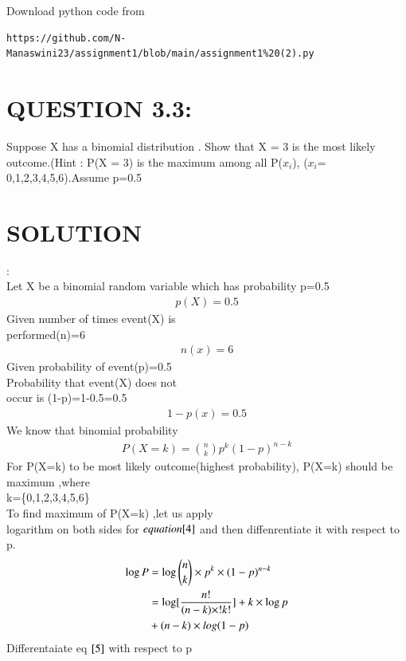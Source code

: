 \documentclass[journal,12pt,twocolumn]{IEEEtran}
\begin{document}
\renewcommand{\thefigure}{\theenumi}
\renewcommand{\thetable}{\theenumi}
Download python code from 
\begin{lstlisting}
https://github.com/N-Manaswini23/assignment1/blob/main/assignment1%20(2).py
\end{lstlisting}
%



\section*{ QUESTION 3.3:}
Suppose X has a binomial
 distribution . Show that X = 3 is the most likely outcome.(Hint : P(X = 3) is the maximum among all P($x_i$), ($x_i$= 0,1,2,3,4,5,6).Assume p=0.5 
 \\
\section*{SOLUTION}:\\
Let X be a binomial random variable which has probability p=0.5\\
 \begin{align}
 p(X)=0.5 \label{1}
 \end{align}
Given number of times event(X) is\\
 performed(n)=6\\
 \begin{align}
 n(x)=6 \label{2}
 \end{align}
Given probability of event(p)=0.5\\
Probability that event(X) does not \\occur is
(1-p)=1-0.5=0.5\\
 \begin{align}
1-p(x)=0.5 \label{3}
 \end{align}
We know that binomial probability\\
\begin{align}
P(X=k)= \binom{n}{k}p^k({1-p})^{n-k}  \label{4} 
\end{align}
For P(X=k) to be most likely outcome(highest probability),
P(X=k) should be maximum ,where\\
 k=\{0,1,2,3,4,5,6\}\\
To find maximum of P(X=k) ,let us  apply \\logarithm on both sides for $equation\eqref{4}$ and then diffenrentiate it with respect
to p.
\begin{align}
\log P&=\log \binom{n}{k}\times p^k\times ({1-p})^{n-k} \\
&=\log[\frac{n!}{(n-k)\times !k!}]+k \times \log p \notag \\
 &+(n-k)\times log (1-p) \label{5}
\end{align}
Differentaiate eq $\eqref{5}$ with respect to p
\end{document}
